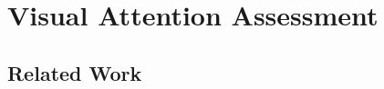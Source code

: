 \documentclass{sig-alternate}
\begin{document}
%
%
%



\section{Visual Attention Assessment}

\subsection{Related Work}
\end{document}
